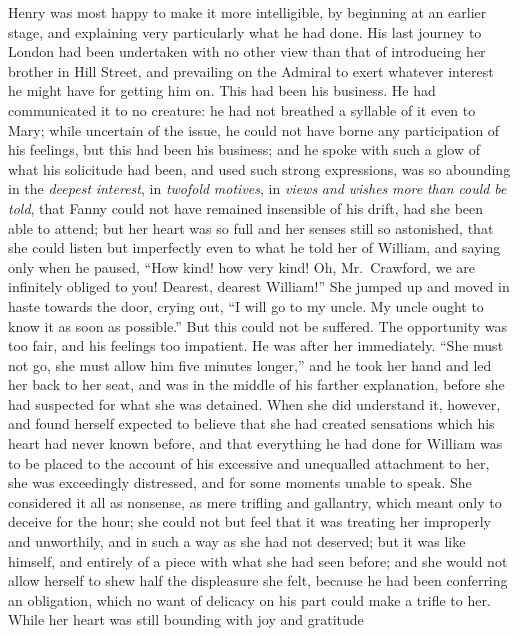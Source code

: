 \documentclass{article}
\begin{document}
Henry was most happy to make it more intelligible,
by beginning at an earlier stage, and explaining very
particularly what he had done.  His last journey to London
had been undertaken with no other view than that of
introducing her brother in Hill Street, and prevailing
on the Admiral to exert whatever interest he might
have for getting him on.  This had been his business.
He had communicated it to no creature:  he had not
breathed a syllable of it even to Mary; while uncertain
of the issue, he could not have borne any participation
of his feelings, but this had been his business; and he
spoke with such a glow of what his solicitude had been,
and used such strong expressions, was so abounding
in the \emph{deepest} \emph{interest}, in \emph{twofold} \emph{motives},
in \emph{views} \emph{and} \emph{wishes} \emph{more} \emph{than} \emph{could} \emph{be} \emph{told},
that Fanny could not have remained insensible of his drift,
had she been able to attend; but her heart was so full
and her senses still so astonished, that she could listen
but imperfectly even to what he told her of William,
and saying only when he paused, ``How kind! how very kind!
Oh, Mr.\ Crawford, we are infinitely obliged to you!
Dearest, dearest William!''  She jumped up and moved in haste
towards the door, crying out, ``I will go to my uncle.
My uncle ought to know it as soon as possible.''  But this
could not be suffered.  The opportunity was too fair,
and his feelings too impatient.  He was after her immediately.
``She must not go, she must allow him five minutes longer,''
and he took her hand and led her back to her seat,
and was in the middle of his farther explanation,
before she had suspected for what she was detained.
When she did understand it, however, and found herself
expected to believe that she had created sensations which
his heart had never known before, and that everything
he had done for William was to be placed to the account
of his excessive and unequalled attachment to her,
she was exceedingly distressed, and for some moments
unable to speak.  She considered it all as nonsense,
as mere trifling and gallantry, which meant only to deceive
for the hour; she could not but feel that it was treating
her improperly and unworthily, and in such a way as she
had not deserved; but it was like himself, and entirely
of a piece with what she had seen before; and she would
not allow herself to shew half the displeasure she felt,
because he had been conferring an obligation, which no
want of delicacy on his part could make a trifle to her.
While her heart was still bounding with joy and gratitude
\end{document}

